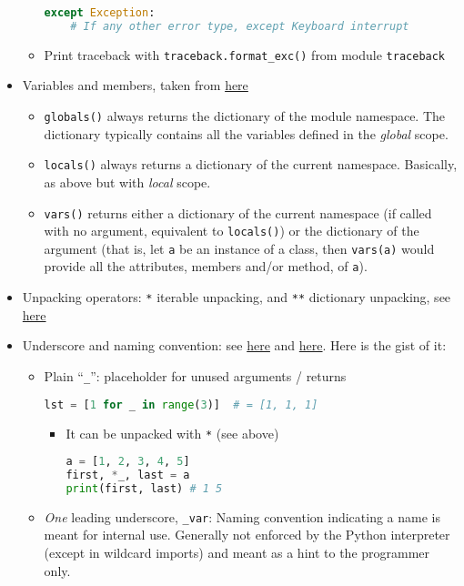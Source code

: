 \documentclass[a4paper,12pt,%
              final%
              ]{article}
\begin{document}
\begin{itemize}
\begin{itemize}
\begin{lstlisting}[language=python]
except Exception:
    # If any other error type, except Keyboard interrupt
\end{lstlisting}
      \item Print traceback with \verb|traceback.format_exc()| from module \texttt{traceback}
    \end{itemize}
  \item Variables and members, taken from \href{https://stackoverflow.com/questions/7969949/whats-the-difference-between-globals-locals-and-vars}{here}
    \begin{itemize}
      \item \verb|globals()| always returns the dictionary of the module namespace. The dictionary typically contains all the variables defined in the \emph{global} scope.
      \item \verb|locals()| always returns a dictionary of the current namespace. Basically, as above but with \emph{local} scope.
      \item \verb|vars()| returns either a dictionary of the current namespace (if called with no argument, equivalent to \verb|locals()|) or the dictionary of the argument (that is, let \verb|a| be an instance of a class, then \verb|vars(a)| would provide all the attributes, members and/or method, of \verb|a|).
    \end{itemize}
  \item Unpacking operators: \verb|*| iterable unpacking, and \verb|**| dictionary unpacking, see \href{https://geekflare.com/python-unpacking-operators/}{here}
  \item Underscore and naming convention: see \href{https://dbader.org/blog/meaning-of-underscores-in-python}{here} and \href{https://realpython.com/python-double-underscore/}{here}. Here is the gist of it:
    \begin{itemize}
      \item Plain ``\verb|_|'': placeholder for unused arguments / returns
\begin{lstlisting}[language=python]
lst = [1 for _ in range(3)]  # = [1, 1, 1]
\end{lstlisting}
        \begin{itemize}
          \item It can be unpacked with \verb|*| (see above)
\begin{lstlisting}[language=python]
a = [1, 2, 3, 4, 5]
first, *_, last = a
print(first, last) # 1 5
\end{lstlisting}
        \end{itemize}
      \item \emph{One} leading underscore, \verb|_var|: Naming convention indicating a name is meant for internal use. Generally not enforced by the Python interpreter (except in wildcard imports) and meant as a hint to the programmer only.

\end{itemize}
\end{itemize}
\end{document}
